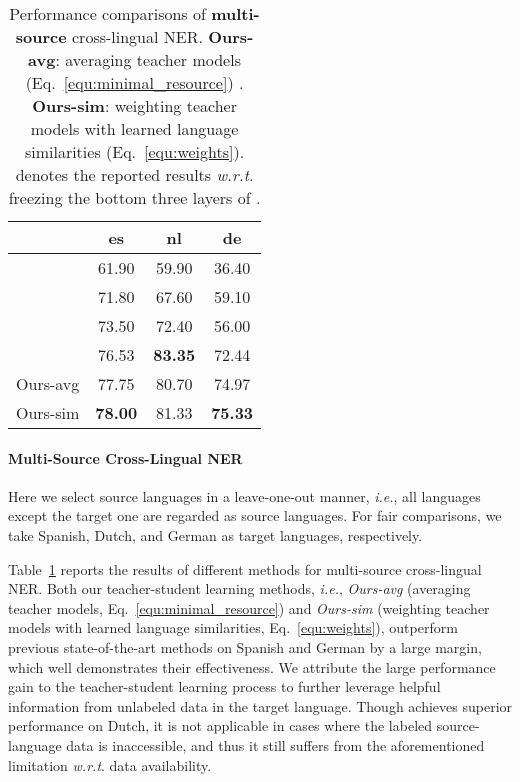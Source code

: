 \documentclass[11pt,a4paper]{article}
\newcommand\ie{\textit{i.e.}}
\newcommand\wrt{\textit{w.r.t}}
\begin{document}
	\begin{table}[t]
		\centering
		\begin{tabular}{c|c|c|c}
			\hline
			&	es	&	nl	&	de \\ \hline
			\citet{tackstrom2012nudging}& 61.90 & 59.90	& 36.40 \\ \hline
			\citet{rahimi2019massively}& 71.80 & 67.60 & 59.10 \\ \hline
			\citet{chen2019multi}& 73.50 & 72.40 & 56.00 \\ \hline
\citet{moon2019lingua} & 76.53 & \textbf{83.35} & 72.44\\ \hline
			\hline
			Ours-avg & 77.75 & 80.70 & 74.97 \\ \hline
			Ours-sim & \textbf{78.00} & 81.33 & \textbf{75.33}\\ \hline
		\end{tabular}
		\caption{Performance comparisons of \textbf{multi-source} cross-lingual NER. 
\textbf{Ours-avg}: averaging teacher models (Eq.~\ref{equ:minimal_resource}) . \textbf{Ours-sim}: weighting teacher models with learned language similarities (Eq.~\ref{equ:weights}).
		 denotes the reported results \wrt. freezing the bottom three layers of .
		}
		\label{tab:multi_source}
	\end{table}
	
	\paragraph{Multi-Source Cross-Lingual NER}
	Here we select source languages in a leave-one-out manner, \ie, all languages except the target one are regarded as source languages. For fair comparisons, we take Spanish, Dutch, and German as target languages, respectively. 

	Table~\ref{tab:multi_source} reports the results of different methods for multi-source cross-lingual NER. 
	Both our teacher-student learning methods, \ie, \textit{Ours-avg} (averaging teacher models, Eq.~\ref{equ:minimal_resource}) and \textit{Ours-sim} (weighting teacher models with learned language similarities, Eq.~\ref{equ:weights}), outperform previous state-of-the-art methods on Spanish and German by a large margin, which well demonstrates their effectiveness. We attribute the large performance gain to the teacher-student learning process to further leverage helpful information from unlabeled data in the target language. Though \citet{moon2019lingua} achieves superior performance on Dutch, it is not applicable in cases where the labeled source-language data is inaccessible, and thus it still suffers from the aforementioned limitation \wrt. data availability.
\end{document}

